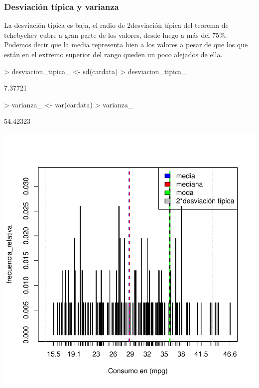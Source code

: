 \documentclass [a4paper] {article}
\begin{document}
\subsubsection{Desviación típica y varianza}
La desviación típica es baja, el radio de 2\*desviación típica del teorema de tchebychev cubre a gran parte de los valores, desde luego a más del 75\%.
Podemos decir que la media representa bien a los valores a pesar de que los que están en el extremo superior del rango queden un poco alejados de ella.
\begin{Schunk}
\begin{Sinput}
> desviacion_tipica_ <- sd(cardata)
> desviacion_tipica_
\end{Sinput}
\begin{Soutput}
[1] 7.37721
\end{Soutput}
\begin{Sinput}
> varianza_ <- var(cardata)
> varianza_
\end{Sinput}
\begin{Soutput}
[1] 54.42323
\end{Soutput}
\end{Schunk}

\begin{center}
\includegraphics{entrega-estadisticos_cardata_plot}
\end{center}
\end{document}
